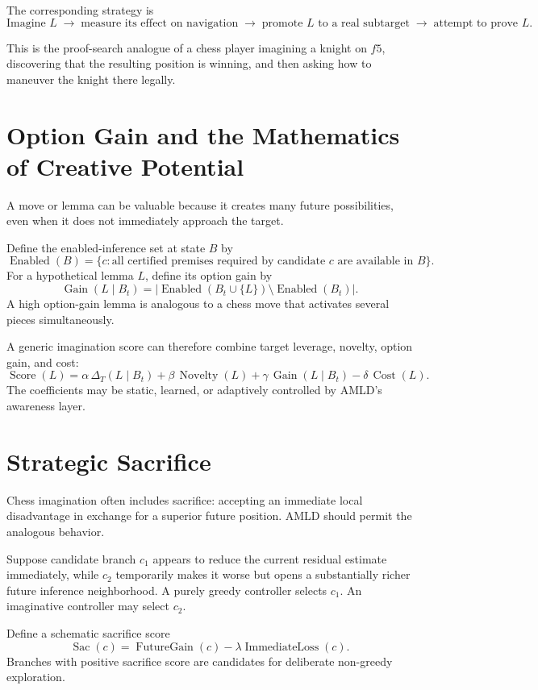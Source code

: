 \documentclass[11pt]{article}
\newcommand{\Enabled}{\operatorname{Enabled}}
\newcommand{\Score}{\operatorname{Score}}
\newcommand{\Novelty}{\operatorname{Novelty}}
\newcommand{\Gain}{\operatorname{Gain}}
\newcommand{\Cost}{\operatorname{Cost}}
\begin{document}
The corresponding strategy is
\[
\boxed{
\text{Imagine }L
\;\to\;
\text{measure its effect on navigation}
\;\to\;
\text{promote }L\text{ to a real subtarget}
\;\to\;
\text{attempt to prove }L.
}
\]

This is the proof-search analogue of a chess player imagining a knight on $f5$, discovering that the resulting position is winning, and then asking how to maneuver the knight there legally.

\section{Option Gain and the Mathematics of Creative Potential}

A move or lemma can be valuable because it creates many future possibilities, even when it does not immediately approach the target.

Define the enabled-inference set at state $B$ by
\[
\Enabled(B)=\{c:\text{all certified premises required by candidate }c\text{ are available in }B\}.
\]
For a hypothetical lemma $L$, define its option gain by
\[
\Gain(L\mid B_t)
=
\left|
\Enabled(B_t\cup\{L\})\setminus\Enabled(B_t)
\right|.
\]
A high option-gain lemma is analogous to a chess move that activates several pieces simultaneously.

A generic imagination score can therefore combine target leverage, novelty, option gain, and cost:
\[
\Score(L)
=
\alpha\,\Delta_T(L\mid B_t)
+
\beta\,\Novelty(L)
+
\gamma\,\Gain(L\mid B_t)
-
\delta\,\Cost(L).
\]
The coefficients may be static, learned, or adaptively controlled by AMLD's awareness layer.

\section{Strategic Sacrifice}

Chess imagination often includes sacrifice: accepting an immediate local disadvantage in exchange for a superior future position. AMLD should permit the analogous behavior.

Suppose candidate branch $c_1$ appears to reduce the current residual estimate immediately, while $c_2$ temporarily makes it worse but opens a substantially richer future inference neighborhood. A purely greedy controller selects $c_1$. An imaginative controller may select $c_2$.

Define a schematic sacrifice score
\[
\operatorname{Sac}(c)
=
\operatorname{FutureGain}(c)
-
\lambda\operatorname{ImmediateLoss}(c).
\]
Branches with positive sacrifice score are candidates for deliberate non-greedy exploration.
\end{document}
